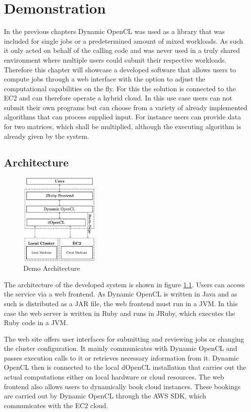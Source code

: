 \chapter{Demonstration}

In the previous chapters Dynamic OpenCL was used as a library that was included for single jobs or a predetermined amount of mixed workloads. As such it only acted on behalf of the calling code and was never used in a truly shared environment where multiple users could submit their respective workloads. Therefore this chapter will showcase a developed software that allows users to compute jobs through a web interface with the option to adjust the computational capabilities on the fly. For this the solution is connected to the EC2 and can therefore operate a hybrid cloud. In this use case users can not submit their own programs but can choose from a variety of already implemented algorithms that can process supplied input. For instance users can provide data for two matrices, which shall be multiplied, although the executing algorithm is already given by the system.

\section{Architecture}

\begin{figure}[!htb]
	\includegraphics[width=0.35\textwidth]{images/demo_architecture.png}
	\centering
	\caption{Demo Architecture}
	\label{img:demo_architecture}
\end{figure}
The architecture of the developed system is shown in figure \ref{img:demo_architecture}. Users can access the service via a web frontend. As Dynamic OpenCL is written in Java and as such is distributed as a JAR file, the web frontend must run in a JVM. In this case the web server is written in Ruby and runs in JRuby, which executes the Ruby code in a JVM. 

The web site offers user interfaces for submitting and reviewing jobs or changing the cluster configuration. It mainly communicates with Dynamic OpenCL and passes execution calls to it or retrieves necessary information from it. Dynamic OpenCL then is connected to the local dOpenCL installation that carries out the actual computations either on local hardware or cloud resources. The web frontend also allows users to dynamically book cloud instances. These bookings are carried out by Dynamic OpenCL through the AWS SDK, which communicates with the EC2 cloud.

